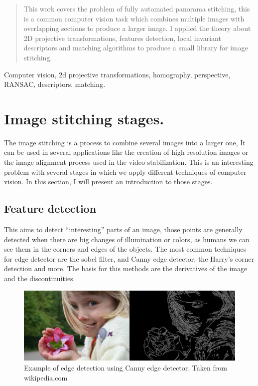 \documentclass[journal]{IEEEtran}
\begin{document}
\begin{abstract}
This work covers the problem of fully automated panorama stitching, this is a
common computer vision task which combines multiple images with overlapping sections
to produce a larger image. I applied the theory about 2D projective transformations,
features detection, local invariant descriptors and matching algorithms to produce
a small library for image stitching.

\end{abstract}

\begin{IEEEkeywords}
Computer vision, 2d projective transformations, homography,
perspective, RANSAC, descriptors, matching.
\end{IEEEkeywords}

\section{Image stitching stages.}

The image stitching is a process to combine several images into a larger one,
It can be used in several applications like the creation of high resolution
images or the image alignment process used in the video stabilization. This is
an interesting problem with several stages in which we apply different
techniques of computer vision. In this section, I will present an introduction
to those stages.

\subsection{Feature detection}

This aims to detect ``interesting'' parts of an image, those points are
generally detected when there are big changes of illumination
or colors, as humans we can see them in the corners and edges of the objects.
The most common techniques for edge detector are the sobel filter,
and Canny edge detector, the Harry's corner detection and more. The basis for
this methods are the derivatives of the image and the discontinuities.

\begin{figure}[H]
\includegraphics[scale=0.16]{../img/edge_detection}
\caption{Example of edge detection using Canny edge detector. Taken from
wikipedia.com}
\label{canny}
\end{figure}
\end{document}
